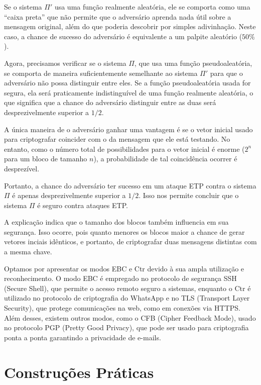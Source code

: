 Se o sistema $\Pi'$ usa uma função realmente aleatória, ele se comporta como uma ``caixa preta'' que não permite que o adversário aprenda nada útil sobre a mensagem original, além do que poderia descobrir por simples adivinhação.
Neste caso, a chance de sucesso do adversário é equivalente a um palpite aleatório ($50\%$).

Agora, precisamos verificar se o sistema $\Pi$, que usa uma função pseudoaleatória, se comporta de maneira suficientemente semelhante ao sistema $\Pi'$ para que o adversário não possa distinguir entre eles.
Se a função pseudoaleatória usada for segura, ela será praticamente indistinguível de uma função realmente aleatória, o que significa que a chance do adversário distinguir entre as duas será desprezivelmente superior a $1/2$.

A única maneira de o adversário ganhar uma vantagem é se o vetor inicial usado para criptografar coincider com o da mensagem que ele está testando.
No entanto, como o número total de possibilidades para o vetor inicial é enorme ($2^n$ para um bloco de tamanho $n$), a probabilidade de tal coincidência ocorrer é desprezível.

Portanto, a chance do adversário ter sucesso em um ataque ETP contra o sistema $\Pi$ é apenas desprezivelmente superior a $1/2$.
Isso nos permite concluir que o sistema $\Pi$ é seguro contra ataques ETP.

A explicação indica que o tamanho dos blocos também influencia em sua segurança.
Isso ocorre, pois quanto menores os blocos maior a chance de gerar vetores inciais idênticos, e portanto, de criptografar duas mensagens distintas com a mesma chave.

Optamos por apresentar os modos EBC e Ctr devido à sua ampla utilização e reconhecimento.
O modo EBC é empregado no protocolo de segurança SSH (Secure Shell), que permite o acesso remoto seguro a sistemas, enquanto o Ctr é utilizado no protocolo de criptografia do WhatsApp e no TLS (Transport Layer Security), que protege comunicações na web, como em conexões via HTTPS.
Além desses, existem outros modos, como o CFB (Cipher Feedback Mode), usado no protocolo PGP (Pretty Good Privacy), que pode ser usado para criptografia ponta a ponta garantindo a privacidade de e-mails.

\section{Construções Práticas}
\label{sec:construcoes-praticas}


